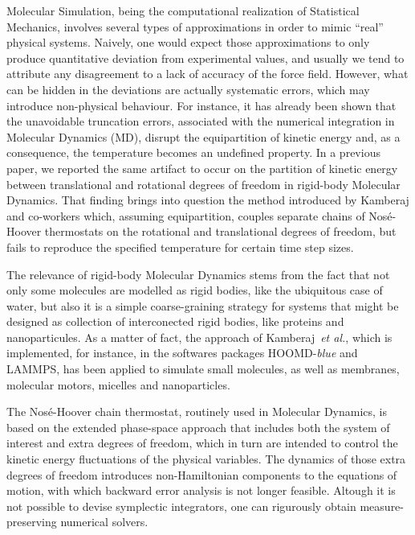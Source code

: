 \documentclass[aip,jcp,reprint,amsmath,amssymb]{revtex4-1}
\begin{document}
Molecular Simulation, being the computational realization of Statistical Mechanics,\cite{Tuckerman2010} involves several types of approximations in order to mimic ``real'' physical systems. Naively, one would expect those approximations to only produce quantitative deviation from experimental values, and usually we tend to attribute any disagreement to a lack of accuracy of the force field. However, what can be hidden in the deviations are actually systematic errors, which may introduce non-physical behaviour. For instance, it has already been shown that the unavoidable truncation errors, associated with the numerical integration in Molecular Dynamics (MD), disrupt the equipartition of kinetic energy and, as a consequence, the temperature becomes an undefined property.\cite{Eastwood_2010} In a previous paper,\citep{Abreu_2017} we reported the same artifact to occur on the partition of kinetic energy between translational and rotational degrees of freedom in rigid-body Molecular Dynamics. That finding brings into question the method introduced by Kamberaj and co-workers\cite{Kamberaj2005} which, assuming equipartition, couples separate chains of Nos\'{e}-Hoover thermostats on the rotational and translational degrees of freedom, but fails to reproduce the specified temperature for certain time step sizes.

The relevance of rigid-body Molecular Dynamics stems from the fact that not only some molecules are modelled as rigid bodies, like the ubiquitous case of water,\cite{Jorgensen_1983} but also it is a simple coarse-graining strategy for systems that might be designed as collection of interconected rigid bodies, like proteins and nanoparticules.\cite{Knorowski2012, Patra2013} As a matter of fact, the approach of Kamberaj~\textit{et al.},\cite{Kamberaj2005} which is implemented, for instance, in the softwares packages HOOMD-\textit{blue}\cite{Anderson_2008} and LAMMPS\cite{Plimpton1995}, has been applied to simulate small molecules,\cite{Geiger_2013,Aimoli_2014,Aimoli_2014_2} as well as membranes,\cite{Bucior_2012} molecular motors,\cite{Akimov_2012} micelles\cite{Yan_2008} and nanoparticles.\cite{Patra_2014}

The Nos\'{e}-Hoover chain thermostat,\cite{Martyna1992} routinely used in Molecular Dynamics, is based on the extended phase-space approach that includes both the system of interest and extra degrees of freedom, which in turn are intended to control the kinetic energy fluctuations of the physical variables. The dynamics of those extra degrees of freedom introduces non-Hamiltonian components to the equations of motion, with which backward error analysis is not longer feasible. Altough it is not possible to devise symplectic integrators, one can rigurously obtain measure-preserving numerical solvers.\cite{Sergi2001,Ezra2004,Ezra2006}
\end{document}
